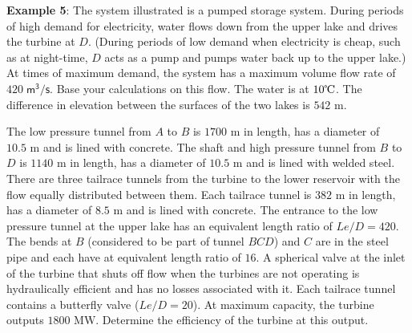 \documentclass[10pt, oneside]{amsart}
\begin{document}
\newpage
\textbf{Example 5}:
The system illustrated is a pumped storage system. During periods of high demand for electricity, water flows down
from the upper lake and drives the turbine at $D$. (During periods of low demand when electricity is cheap, such as at
night-time, $D$ acts as a pump and pumps water back up to the upper lake.)
\parm
At times of maximum demand, the system has a maximum volume flow rate of $420\;\mathsf{m^3/s}$. Base your
calculations on this flow. The water is at $10\text{\textcelsius}$.
\parm
The difference in elevation between the surfaces of the two lakes is $542\text{	m}$. \par\medskip
The low pressure tunnel from $A$ to $B$ is $1700\text{ m}$ in length, has a diameter of $10.5\text{ m}$
and is lined with concrete. The shaft and high pressure tunnel from $B$ to $D$ is $1140\text{ m}$ in length, has a diameter of $10.5\text{ m}$ and
is lined with welded steel.
\parm
There are three tailrace tunnels from the turbine to the lower reservoir with the flow equally distributed between them. Each tailrace tunnel is $382\text{ m}$ in length, has a diameter of $8.5\text{ m}$ and is lined with concrete.
\parm
The entrance to the low pressure tunnel at the upper lake has an equivalent length ratio of $Le/D=420$. The bends at
$B$ (considered to be part of tunnel $BCD$) and $C$ are in the steel pipe and each have at equivalent length ratio of $16$. A spherical valve at the inlet of the turbine that shuts off flow when the turbines are not operating is hydraulically efficient and has no losses associated with it. Each tailrace tunnel contains a butterfly valve ($Le/D=20$).
\parm
At maximum capacity, the turbine outputs $1800 \text{ MW}$. Determine the efficiency of the turbine at this output.
\parb
\vspace{1cm}
\end{document}
